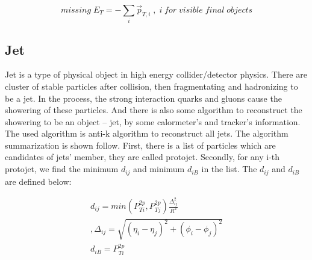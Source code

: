 		\begin{equation}
		missing\;E_T = - \sum_{i}^{} \vec{p}_{T,i} \;, \; i\;for\;visible\;final\;objects
		\label{eq:MET}
		\end{equation}
		\FloatBarrier
		

	\subsection{Jet}
	\label{ssec:PhysObj_jet}


		Jet is a type of physical object in high energy collider/detector physics. There are cluster of stable particles after collision, then fragmentating and hadronizing to be a jet. In the process, the strong interaction quarks and gluons cause the showering of these particles. And there is also some algorithm to reconstruct the showering to be an object -- jet, by some calormeter's and tracker's information.
		The used algorithm is anti-k algorithm to reconstruct all jets. The algorithm summarization is shown follow. First, there is a list of particles which are candidates of jets' member, they are called protojet. Secondly, for any i-th protojet, we find the minimum $d_{ij}$ and minimum $d_{iB}$ in the list. The $d_{ij}$ and $d_{iB}$ are defined below:

		\begin{equation}
		\begin{split}
		d_{ij} = min(P_{Ti}^{2p}, P_{Tj}^{2p}) \frac{\Delta_{ij}^2}{R^2}\\
		, \Delta_{ij} = \sqrt{ (\eta_i - \eta_j)^2 + (\phi_i - \phi_j)^2 }\\
		d_{iB} = P_{Ti}^{2p}
		\end{split}
		\label{eq:jet_reco_algo}
		\end{equation}
		\FloatBarrier

